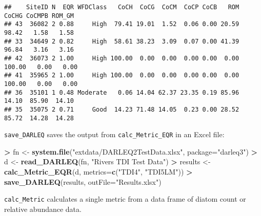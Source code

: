 \documentclass[]{article}
\newenvironment{Shaded}{\begin{snugshade}}{\end{snugshade}}
\newcommand{\KeywordTok}[1]{\textcolor[rgb]{0.13,0.29,0.53}{\textbf{#1}}}
\newcommand{\DataTypeTok}[1]{\textcolor[rgb]{0.13,0.29,0.53}{#1}}
\newcommand{\StringTok}[1]{\textcolor[rgb]{0.31,0.60,0.02}{#1}}
\newcommand{\OperatorTok}[1]{\textcolor[rgb]{0.81,0.36,0.00}{\textbf{#1}}}
\newcommand{\NormalTok}[1]{#1}
\begin{document}
\begin{Shaded}
\end{Shaded}

\begin{verbatim}
##    SiteID N  EQR WFDClass   CoCH  CoCG  CoCM  CoCP CoCB   ROM  CoCHG CoCMPB ROM_GM
## 43  36082 2 0.88     High  79.41 19.01  1.52  0.06 0.00 20.59  98.42   1.58   1.58
## 33  34649 2 0.82     High  58.61 38.23  3.09  0.07 0.00 41.39  96.84   3.16   3.16
## 42  36073 2 1.00     High 100.00  0.00  0.00  0.00 0.00  0.00 100.00   0.00   0.00
## 41  35965 2 1.00     High 100.00  0.00  0.00  0.00 0.00  0.00 100.00   0.00   0.00
## 36  35101 1 0.48 Moderate   0.06 14.04 62.37 23.35 0.19 85.96  14.10  85.90  14.10
## 35  35075 2 0.71     Good  14.23 71.48 14.05  0.23 0.00 28.52  85.72  14.28  14.28
\end{verbatim}

\texttt{save\_DARLEQ} saves the output from \texttt{calc\_Metric\_EQR}
in an Excel file:

\begin{Shaded}
\begin{Highlighting}[]
\OperatorTok{>}\StringTok{ }\NormalTok{fn <-}\StringTok{ }\KeywordTok{system.file}\NormalTok{(}\StringTok{"extdata/DARLEQ2TestData.xlsx"}\NormalTok{, }\DataTypeTok{package=}\StringTok{"darleq3"}\NormalTok{)}
\OperatorTok{>}\StringTok{ }\NormalTok{d <-}\StringTok{ }\KeywordTok{read_DARLEQ}\NormalTok{(fn, }\StringTok{"Rivers TDI Test Data"}\NormalTok{)}
\OperatorTok{>}\StringTok{ }\NormalTok{results <-}\StringTok{ }\KeywordTok{calc_Metric_EQR}\NormalTok{(d, }\DataTypeTok{metrics=}\KeywordTok{c}\NormalTok{(}\StringTok{"TDI4"}\NormalTok{, }\StringTok{"TDI5LM"}\NormalTok{))}
\OperatorTok{>}\StringTok{ }\KeywordTok{save_DARLEQ}\NormalTok{(results, }\DataTypeTok{outFile=}\StringTok{"Results.xlsx"}\NormalTok{)}
\end{Highlighting}
\end{Shaded}

\texttt{calc\_Metric} calculates a single metric from a data frame of
diatom count or relative abundance data.

\begin{Shaded}
\end{Shaded}
\end{document}
